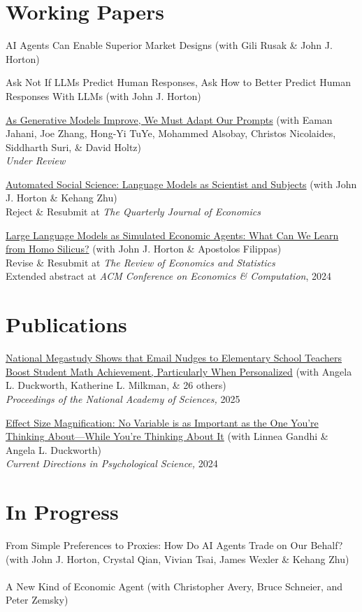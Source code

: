 \documentclass[margin,line,pifont,palatino,courier, 9pt]{res}
\begin{document}
\begin{resume}
\section{\sc Working Papers}

AI Agents Can Enable Superior Market Designs (with Gili Rusak \& John J. Horton)

Ask Not If LLMs Predict Human Responses, Ask How to Better Predict Human Responses With LLMs (with John J. Horton)

\href{https://arxiv.org/abs/2407.14333}{As Generative Models Improve, We Must Adapt Our Prompts} (with Eaman Jahani, Joe Zhang, Hong-Yi TuYe, Mohammed Alsobay, Christos Nicolaides, Siddharth
Suri, \& David Holtz)\\
\textit{Under Review}

\href{https://www.nber.org/papers/w32381}{Automated Social Science: Language Models as Scientist and Subjects} (with John J. Horton \& Kehang Zhu)\\
Reject \& Resubmit at \textit{The Quarterly Journal of Economics}

\href{https://www.nber.org/papers/w31122}{Large Language Models as Simulated Economic Agents: What Can We Learn from Homo Silicus?} (with John J. Horton \& Apostolos Filippas)\\
Revise \& Resubmit at \textit{The Review of Economics and Statistics}\\
Extended abstract at \textit{ACM Conference on Economics \& Computation}, 2024


\section{\sc Publications}
\href{https://www.pnas.org/doi/10.1073/pnas.2418616122}{National Megastudy Shows that Email Nudges to Elementary School Teachers Boost Student Math Achievement, Particularly When Personalized} (with Angela L. Duckworth, Katherine L. Milkman, \& 26 others)\\
\textit{Proceedings of the National Academy of Sciences,} 2025

\href{https://journals.sagepub.com/doi/full/10.1177/09637214241268222}{Effect Size Magnification: No Variable is as Important as the One You're Thinking About---While You're Thinking About It} (with Linnea Gandhi \& Angela L. Duckworth)\\
\textit{Current Directions in Psychological Science,} 2024

\section{\sc In Progress}
From Simple Preferences to Proxies: How Do AI Agents Trade on Our Behalf?
(with John J. Horton, Crystal Qian, Vivian Tsai, James Wexler \& Kehang Zhu)\\\\
A New Kind of Economic Agent
(with Christopher Avery, Bruce Schneier, and Peter Zemsky)


\end{resume}
\end{document}
